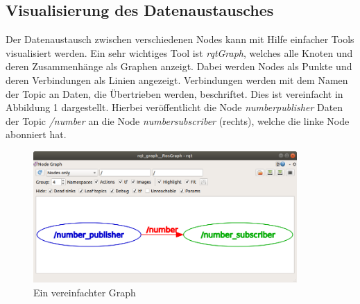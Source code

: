 {	\subsection{Visualisierung des Datenaustausches}
	{
		Der Datenaustausch zwischen verschiedenen Nodes kann mit Hilfe einfacher Tools visualisiert werden. Ein sehr wichtiges Tool ist \textit{rqt\textunderscore Graph}, welches alle Knoten und deren Zusammenhänge als Graphen anzeigt. Dabei werden Nodes als Punkte und deren Verbindungen als Linien angezeigt. Verbindungen werden mit dem Namen der Topic an Daten, die Übertrieben werden, beschriftet. Dies ist vereinfacht in Abbildung 1 dargestellt. Hierbei veröffentlicht die Node \textit{number\textunderscore publisher} Daten der Topic \textit{/number} an die Node \textit{number\textunderscore subscriber} (rechts), welche die linke Node abonniert hat.
		
		\begin{figure}
			\centering
			\includegraphics[height=5cm]{Bilder/rqt_graph_simplified.png}
			\caption{Ein vereinfachter Graph \\
			\parencite{rqtgraphsimplified1}} 
			\label{pic:rqt_graph_simplified}
		\end{figure}
	}

}
